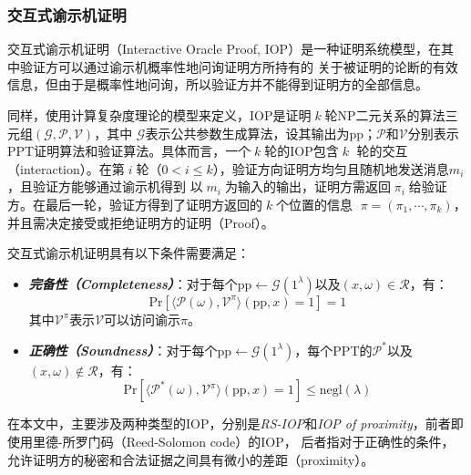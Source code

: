 \documentclass[zihao=-4]{ctexart}
\begin{document}
\subsubsection{交互式谕示机证明}
交互式谕示机证明\cite{seven}\cite{Thirty-nine}（Interactive Oracle Proof, IOP）是一种证明系统模型，在其中验证方可以通过谕示机概率性地问询证明方所持有的
关于被证明的论断的有效信息，但由于是概率性地问询，所以验证方并不能得到证明方的全部信息。\par
同样，使用计算复杂度理论的模型来定义，IOP是证明$\;k\;$轮NP二元关系的算法三元组$(\mathcal{G},\mathcal{P},\mathcal{V})$，其中
$\mathcal{G}$表示公共参数生成算法，设其输出为pp；$\mathcal{P}$和$\mathcal{V}$分别表示PPT证明算法和验证算法。具体而言，一个$\;k\;$轮的IOP包含$\;k\;$
轮的交互（interaction）。在第$\;i\;$轮（$0<i\le k$），验证方向证明方均匀且随机地发送消息$m_i$，且验证方能够通过谕示机得到
以$\;m_i\;$为输入的输出，证明方需返回$\;\pi_i\;$给验证方。在最后一轮，验证方得到了证明方返回的$\;k\;$个位置的信息
$\;\pi=(\pi_1,\cdots,\pi_k)$，并且需决定接受或拒绝证明方的证明（Proof）。\par
交互式谕示机证明\cite{six}具有以下条件需要满足：
\begin{itemize}
  \item \textbf{\emph{完备性（Completeness）}}：对于每个pp$\leftarrow\mathcal{G}(1^{\lambda})$以及$(x,\omega)\in\mathcal{R}$，有：
        \[\text{Pr}[\langle \mathcal{P}(\omega),\mathcal{V}^{\pi}\rangle(\text{pp},x)=1]=1\]
        其中$\mathcal{V}^{\pi}$表示$\mathcal{V}$可以访问谕示$\pi$。
  \item \textbf{\emph{正确性（Soundness）}}：对于每个pp$\leftarrow\mathcal{G}(1^{\lambda})$，每个PPT的$\mathcal{P^*}$以及$(x,\omega)\not\in\mathcal{R}$，有：
        \[\text{Pr}[\langle \mathcal{P}^*(\omega),\mathcal{V}^{\pi}\rangle(\text{pp},x)=1]\le\text{negl}(\lambda)\]
\end{itemize}\par
在本文中，主要涉及两种类型的IOP，分别是\emph{RS-IOP}和\emph{IOP of proximity}，前者即使用里德-所罗门码（Reed-Solomon code）的IOP，
后者指对于正确性的条件，允许证明方的秘密和合法证据之间具有微小的差距（proximity）。
\end{document}
